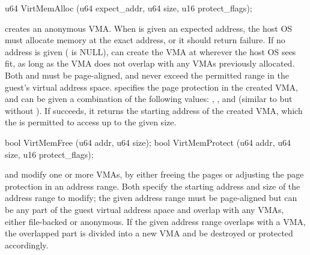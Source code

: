 \begin{paldef}
u64  VirtMemAlloc   (u64 expect_addr, u64 size, u16 protect_flags);
\end{paldef}


 creates an anonymous VMA. When  is given an expected address, the host OS must allocate memory at the exact address,
or it should return failure.
If no address is given ( is NULL),  can create the VMA at wherever the host OS sees fit, as long as the VMA does not overlap with any VMAs previously allocated.
Both  and 
must be page-aligned, and never exceed the permitted range in the guest's virtual address space.
 specifies the page protection in the created VMA, and can be given a combination of the following values: , , and  (similar to  but without ).
If  succeeds, it returns the starting address
of the created VMA, which the \libos{} is permitted to access up to the given size.





\begin{paldef}
bool VirtMemFree    (u64 addr, u64 size);
bool VirtMemProtect (u64 addr, u64 size, u16 protect_flags);
\end{paldef}


 and  modify one or more VMAs, 
by either freeing the pages
or adjusting the page protection in an address range.
Both \hostapis{} specify the starting address and size of the address range to modify;
the given address range must be page-aligned
but can be any part of the guest virtual address apace
and overlap with any VMAs, either file-backed or anonymous.
If the given address range overlaps with a VMA, the overlapped part is divided into a new VMA and be destroyed or protected accordingly.


 





